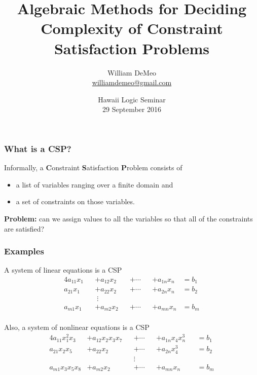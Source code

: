 \documentclass[12pt,xcolor=dvipsnames%
   ]{beamer}
\renewcommand{\.}{\cdot}
\begin{document}
\title[Algebraic CSP]{Algebraic Methods for Deciding Complexity of Constraint Satisfaction Problems}
\author[\url{williamdemeo@gmail.com}]{William DeMeo\\
{\small \url{williamdemeo@gmail.com}}}

\date[29 Sep 2016]{Hawaii Logic Seminar\\[10pt]
29 September 2016}

\frame[plain]{\titlepage}


\begin{frame}
\frametitle{What is a CSP?}

  Informally, a \textbf{C}onstraint \textbf Satisfaction \textbf Problem
  consists of
  \begin{itemize}
  \item a list of variables ranging over a finite domain and
  \item a set of constraints on those variables.
  \end{itemize}

  \textbf{Problem:} can we assign values to all the variables so that
  all of the constraints are satisfied?

\end{frame}

\begin{frame}
  \frametitle{Examples}

A system of linear equations is a CSP
\begin{alignat*}4
  a_{11}x_1 &&+ a_{12}x_2 &&+ \cdots &&+ a_{1n}x_n &= b_1 \\
  a_{21}x_1 &&+ a_{22}x_2 &&+ \cdots &&+ a_{2n}x_n &= b_2 \\
  &&\;\vdots \\
  a_{m1}x_1 &&+ a_{m2}x_2 &&+ \cdots &&+ a_{mn}x_n &= b_m \\
\end{alignat*}
\end{frame}

\begin{frame}
  Also, a system of nonlinear equations is a CSP
\begin{alignat*}4
  a_{11}x_1^2x_3 &+ a_{12}x_2x_3x_7 &&+ \cdots &&+ a_{1n}x_4x_n^3 &&= b_1 \\
  a_{21}x_2x_5 &+ a_{22}x_2 &&+ \cdots &&+ a_{2n}x_4^3 &&= b_2 \\
 &&&\vdots \\
  a_{m1}x_3x_5x_8 &+ a_{m2}x_2 &&+ \cdots &&+ a_{mn}x_n &&= b_m \\
\end{alignat*}
\end{frame}
\end{document}
